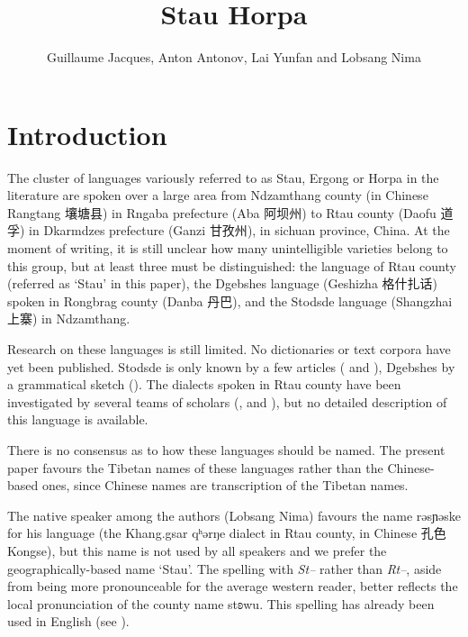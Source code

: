 \documentclass[oneside,a4paper,11pt]{article}
\newcommand{\ipa}[1]{{\phon #1}} %
\newcommand{\zh}[1]{{\cn #1}}
\begin{document}
 


\title{Stau Horpa}
\author{Guillaume Jacques, Anton Antonov, Lai Yunfan and Lobsang Nima}

\maketitle

 

\section{Introduction}
The cluster of languages variously referred to as Stau, Ergong or Horpa in the literature are spoken over a large area from Ndzamthang county (in Chinese Rangtang  \zh{壤塘县})  in Rngaba  prefecture (Aba \zh{阿坝州}) to Rtau county (Daofu \zh{道孚}) in Dkarmdzes prefecture (Ganzi \zh{甘孜州}), in sichuan province, China. At the moment of writing, it is still unclear how many unintelligible varieties belong to this group, but at least three must be distinguished: the language of Rtau county (referred as `Stau' in this paper), the Dgebshes language (Geshizha \zh{格什扎话})  spoken in Rongbrag county (Danba \zh{丹巴}), and the Stodsde language (Shangzhai \zh{上寨}) in Ndzamthang.  

Research on these languages is still limited. No dictionaries or text corpora have yet been published. Stodsde is only known by a few articles (\citet{jackson00sidaba} and   \citet{jackson07shangzhai}), Dgebshes by a grammatical sketch (\citealt{duoerji98geshizha}). The dialects spoken in Rtau county have been investigated by several teams of scholars (\citet{huangbf91daofu}, \citet{sun13gexi} and \citealt{jacques14rtau}), but no detailed description of this language is available.

There is no consensus as to how these languages should be named. The present paper favours the Tibetan names of these languages rather than the Chinese-based ones, since Chinese names are transcription of the Tibetan names. 

  The native speaker among the authors (Lobsang Nima) favours the name \ipa{rəsɲəske} for his language (the Khang.gsar \ipa{qʰərŋe} dialect in Rtau county, in Chinese \zh{孔色} Kongse), but this name is not used by all speakers and we prefer the geographically-based name  `Stau'. The spelling with \textit{St--} rather than \textit{Rt--}, aside from being more pronounceable for the average western reader, better reflects the local pronunciation of the county name \ipa{stʚwu}. This spelling has already been used in English (see \citealt{wang70stau}).   
  
\end{document}
